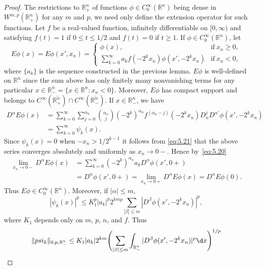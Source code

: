 \begin{proof}
  The restrictions to $\mathbb{R}^n_+$ of functions $\phi\in C_0^\infty(\mathbb{R}^n)$
  being dense in $W^{m,p}(\mathbb{R}^n_+)$ for any $m$ and $p$, we need only
  define the extension operator for such functions. Let $f$ be a real-valued
  function, infinitely differentiable on $[0,\infty)$ and satisfying
  $f(t)=1$ if $0\leq t\leq 1/2$ and $f(t)=0$ if $t\geq 1$.
  If $\phi\in C_0^\infty(\mathbb{R}^n)$, let
  \[ E\phi(x) = E\phi(x',x_n) = 
      \begin{cases}
        \phi(x), & \text{if}\ x_n\geq 0, \\
        \sum_{k=0}^\infty a_k f(-2^k x_n) \phi(x',-2^k x_n) & \text{if}\ x_n<0,
      \end{cases}\]
  where $\{a_k\}$ is the sequence constructed in the previous lemma.
  $E\phi$ is well-defined on $\mathbb{R}^n$ since the sum above has only
  finitely many nonvanishing terms for any particular
  $x\in \mathbb{R}^n_- = \{x\in \mathbb{R}^n : x_n<0\}$.
  Moreover, $E\phi$ has compact support and belongs to
  $C^\infty(\overline{\mathbb{R}^n_+}) \cap C^\infty(\overline{\mathbb{R}^n_-})$.
  If $x\in \mathbb{R}^n_-$, we have
  \begin{align*}
    D^\alpha E\phi(x)
    & = \sum_{k=0}^\infty \sum_{j=0}^{\alpha_n} \binom{\alpha_n}{j}
        (-2^k)^{\alpha_n} f^{(\alpha_n-j)}(-2^k x_n) D_n^j D^{\alpha'} \phi(x',-2^kx_n) \\
    & = \sum_{k=0}^\infty \psi_k(x).
  \end{align*}
  Since $\psi_k(x)=0$ when $-x_n > 1/2^{k-1}$ it follows from \eqref{eq:5.21}
  that the above series converges absolutely and uniformly as $x_n\to 0-$.
  Hence by~\eqref{eq:5.20}
  \begin{align*}
    \lim_{x_n\to 0-} D^\alpha E\phi(x)
    & = \sum_{k=0}^{\infty} (-2^k)^{\alpha_n} a_k D^\alpha \phi(x',0+) \\
    & = D^\alpha \phi(x',0+) = \lim_{x_n\to 0+} D^\alpha E\phi(x) = D^\alpha E\phi(0).
  \end{align*}
  Thus $E\phi \in C_0^\infty(\mathbb{R}^n)$. Moreover, if $|\alpha|\leq m$,
  \[ |\psi_k(x)|^p \leq K_1^p |a_k|^p 2^{kmp}
      \sum_{|\beta|\leq m} |D^\beta \phi(x', -2^k x_n)|^p, \]
  where $K_1$ depends only on $m$, $p$, $n$, and $f$. Thus
  \begin{align*}
    \|psi_k\|_{0,p,\mathbb{R}^n_-}
    & \leq K_1 |a_k| 2^{km} \Biggl(\sum_{|\beta|\leq m} \int_{\mathbb{R}^n_-}
        |D^\beta \phi(x',-2^k x_n)|^p \d x\Biggr)^{1/p} \\

\end{align*}
\end{proof}
